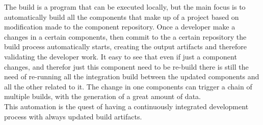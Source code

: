 \documentclass[../main.tex]{subfiles}
\begin{document}
The build is a program that can be executed locally, but the main focus is to automatically build all the components that make up of a project based on modification made to the component repository. Once a developer make a changes in a certain components, then commit to the a certain repository the build process automatically starts, creating the output artifacts and therefore validating the developer work. It easy to see that even if just a component changes, and therefor just this component need to be re-build there is still the need of re-running all the integration build between the updated components and all the other related to it. The change in one components can trigger a chain of multiple builds, with the generation of a great amount of data.\\
This automation is the quest of having a continuously integrated development process with always updated build artifacts. 
\cleardoublepage
\end{document}
